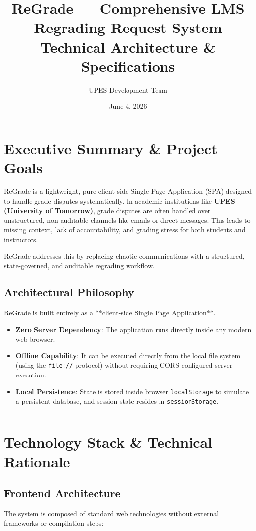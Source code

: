 \documentclass{article}
\title{\textbf{ReGrade --- Comprehensive LMS Regrading Request System} \\ Technical Architecture \& Specifications}
\author{UPES Development Team}
\date{June 4, 2026}
\begin{document}
\maketitle

\tableofcontents
\newpage

\section{Executive Summary \& Project Goals}

ReGrade is a lightweight, pure client-side Single Page Application (SPA) designed to handle grade disputes systematically. In academic institutions like \textbf{UPES (University of Tomorrow)}, grade disputes are often handled over unstructured, non-auditable channels like emails or direct messages. This leads to missing context, lack of accountability, and grading stress for both students and instructors.

ReGrade addresses this by replacing chaotic communications with a structured, state-governed, and auditable regrading workflow.

\subsection{Architectural Philosophy}
ReGrade is built entirely as a **client-side Single Page Application**. 
\begin{itemize}
    \item \textbf{Zero Server Dependency}: The application runs directly inside any modern web browser.
    \item \textbf{Offline Capability}: It can be executed directly from the local file system (using the \texttt{file://} protocol) without requiring CORS-configured server execution.
    \item \textbf{Local Persistence}: State is stored inside browser \texttt{localStorage} to simulate a persistent database, and session state resides in \texttt{sessionStorage}.
\end{itemize}

\begin{center}\rule{0.5\linewidth}{0.5pt}\end{center}

\section{Technology Stack \& Technical Rationale}

\subsection{Frontend Architecture}
The system is composed of standard web technologies without external frameworks or compilation steps:
\end{document}
